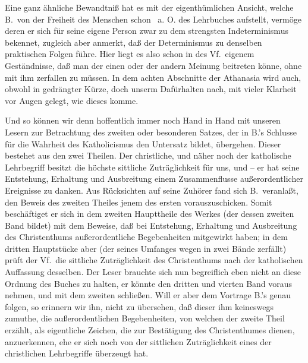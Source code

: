 Eine ganz ähnliche Bewandtniß hat es mit der eigenthümlichen Ansicht, welche B.\ von der Freiheit des Menschen schon  \ua\  a. O. des Lehrbuches aufstellt, vermöge deren er sich für seine eigene Person zwar zu dem strengsten Indeterminismus bekennet, zugleich aber anmerkt, daß der Determinismus zu denselben praktischen Folgen führe. Hier liegt es also schon in des Vf.\ eigenem Geständnisse, daß man der einen oder der andern Meinung beitreten könne, ohne mit ihm zerfallen zu müssen. In dem achten Abschnitte der Athanasia wird auch, obwohl in gedrängter Kürze, doch unserm Dafürhalten nach, mit vieler Klarheit vor Augen gelegt, wie dieses komme. \par

Und so können wir denn hoffentlich immer noch Hand in Hand mit unseren Lesern zur Betrachtung des zweiten oder besonderen Satzes, der in B.'s Schlusse für die Wahrheit des Katholicismus den Untersatz bildet, übergehen.  Dieser bestehet aus den zwei Theilen. Der christliche, und näher noch der katholische Lehrbegriff besitzt die höchste sittliche Zuträglichkeit für uns, und -- er hat seine Entstehung, Erhaltung und Ausbreitung einem Zusammenflusse außerordentlicher Ereignisse zu danken. Aus Rücksichten auf seine Zuhörer fand sich B.\ veranlaßt, den Beweis des zweiten Theiles jenem des ersten vorauszuschicken. Somit beschäftiget er sich in dem zweiten Haupttheile des Werkes (der dessen zweiten Band bildet) mit dem Beweise, daß bei Entstehung, Erhaltung und Ausbreitung des Christenthums außerordentliche Begebenheiten mitgewirkt haben; in dem dritten Hauptstücke aber (der seines Umfanges wegen in zwei Bände zerfällt) prüft der Vf.\ die sittliche Zuträglichkeit des Christenthums nach der katholischen Auffassung desselben. Der Leser brauchte sich nun begreiflich eben nicht an diese Ordnung des Buches zu halten, er könnte den dritten und vierten Band voraus nehmen, und mit dem zweiten schließen. Will er aber dem Vortrage B.'s genau folgen, so erinnern wir ihn, nicht zu übersehen, daß dieser ihm keineswegs zumuthe, die außerordentlichen Begebenheiten, von welchen der zweite Theil erzählt, als eigentliche Zeichen, die zur Bestätigung des Christenthumes dienen, anzuerkennen, ehe er sich noch von der sittlichen Zuträglichkeit eines der christlichen Lehrbegriffe überzeugt hat. \par
